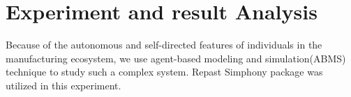 \section{Experiment and result Analysis} %
\label{sec:Experiment_results}

Because of the  autonomous and self-directed features of individuals in the manufacturing ecosystem, we use agent-based modeling and simulation(ABMS) technique \cite{Macal2009,north2007managing} to study such a complex system. Repast Simphony \cite{North2013} package was utilized in this experiment.

%     
%     
%     
%     
%     
%     
%     
%     
% 
% 	


